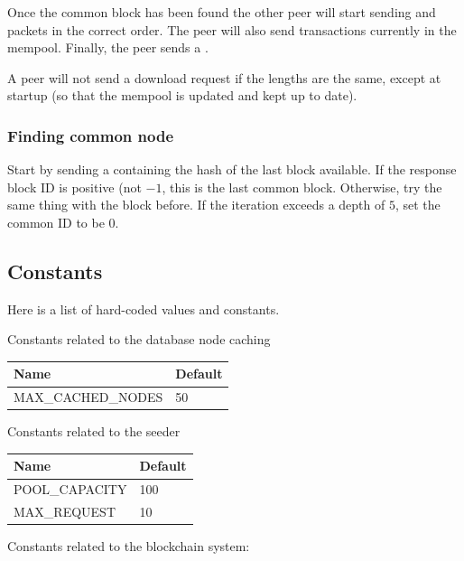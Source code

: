 \documentclass[../documentation.tex]{subfiles}
\begin{document}
Once the common block has been found the other peer will start sending
 and  packets in the correct order.
The peer will also send transactions currently in the mempool. Finally, the peer sends a
.

A peer will not send a download request if the lengths are the same, except
at startup (so that the mempool is updated and kept up to date).

\subsubsection{Finding common node}

Start by sending a  containing the hash of the last block
available. If the response block ID is positive (not \(-1\), this is the last common block.
Otherwise, try the same thing with the block before. If the iteration exceeds a depth of \(5\),
set the common ID to be 0.

\pagebreak

\hypertarget{constants}{}
\subsection{Constants}

Here is a list of hard-coded values and constants.

Constants related to the database node caching

\bgroup{}
\def\arraystretch{1.25}
\begin{tabular}{|l|l|}
    \hline
    \textbf{Name} & \textbf{Default}
    \\ \hline
    MAX\_CACHED\_NODES & 50
    \\ \hline
\end{tabular}
\egroup{}

Constants related to the seeder

\bgroup{}
\def\arraystretch{1.25}
\begin{tabular}{|l|l|}
    \hline
    \textbf{Name} & \textbf{Default}
    \\ \hline
    POOL\_CAPACITY & 100
    \\ \hline
    MAX\_REQUEST & 10
    \\ \hline
\end{tabular}
\egroup{}

Constants related to the blockchain system:
\end{document}
